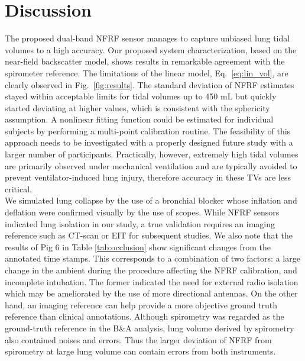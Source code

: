 \documentclass[journal,twoside,web]{ieeecolor}
\begin{document}
\section{Discussion}
The proposed dual-band NFRF sensor manages to capture unbiased lung tidal volumes to a high accuracy. Our proposed system characterization, based on the near-field backscatter model, shows results in remarkable agreement with the spirometer reference. The limitations of the linear model, Eq.~\ref{eq:lin_vol}, are clearly observed in Fig.~\ref{fig:results}. The standard deviation of NFRF estimates stayed within acceptable limits for tidal volumes up to 450 mL but quickly started deviating at higher values, which is consistent with the sphericity assumption. A nonlinear fitting function could be estimated for individual subjects by performing a multi-point calibration routine. The feasibility of this approach needs to be investigated with a properly designed future study with a larger number of participants. Practically, however, extremely high tidal volumes are primarily observed under mechanical ventilation and are typically avoided to prevent ventilator-induced lung injury, therefore accuracy in these TVs are less critical.\\
We simulated lung collapse by the use of a bronchial blocker whose inflation and deflation were confirmed visually by the use of scopes. While NFRF sensors indicated lung isolation in our study, a true validation requires an imaging reference such as CT-scan or EIT for subsequent studies. We also note that the results of Pig 6 in Table \ref{tab:occlusion} show significant changes from the annotated time stamps. This corresponds to a combination of two factors: a large change in the ambient during the procedure affecting the NFRF calibration, and incomplete intubation. The former indicated the need for external radio isolation which may be ameliorated by the use of more directional antennas. On the other hand, an imaging reference can help provide a more objective ground truth reference than clinical annotations. Although spirometry was regarded as the ground-truth reference in the B\&A analysis, lung volume derived by spirometry also contained noises and errors.  Thus the larger deviation of NFRF from spirometry at large lung volume can contain errors from both instruments.\\
\end{document}
